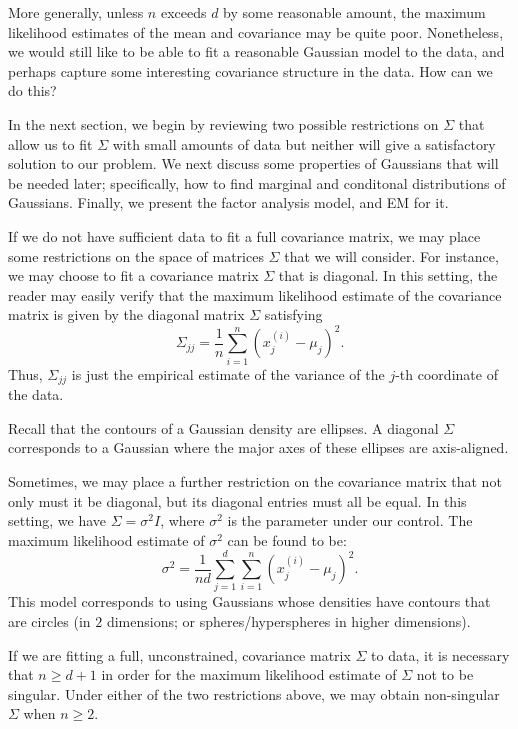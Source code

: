 More generally, unless $n$ exceeds $d$ by some reasonable amount, the maximum likelihood estimates of the mean and covariance may be quite poor.
Nonetheless, we would still like to be able to fit a reasonable Gaussian model
to the data, and perhaps capture some interesting covariance structure in
the data. How can we do this?

In the next section, we begin by reviewing two possible restrictions on
$\Sigma$ that allow us to fit $\Sigma$ with small amounts of data but neither will give
a satisfactory solution to our problem. We next discuss some properties of
Gaussians that will be needed later; specifically, how to find marginal and
conditonal distributions of Gaussians. Finally, we present the factor analysis
model, and EM for it.

\vspace{1cm}
If we do not have sufficient data to fit a full covariance matrix, we may
place some restrictions on the space of matrices $\Sigma$ that we will consider. For
instance, we may choose to fit a covariance matrix $\Sigma$ that is diagonal. In this
setting, the reader may easily verify that the maximum likelihood estimate
of the covariance matrix is given by the diagonal matrix $\Sigma$ satisfying
\[
\Sigma_{jj} =
\frac 1 n \sum^n_{i=1} (x^{(i)}_j - \mu_j)^2.
\]
Thus, $\Sigma_{jj}$ is just the empirical estimate of the variance of the $j$-th coordinate
of the data.

Recall that the contours of a Gaussian density are ellipses. A diagonal
$\Sigma$ corresponds to a Gaussian where the major axes of these ellipses are axis-aligned.

Sometimes, we may place a further restriction on the covariance matrix
that not only must it be diagonal, but its diagonal entries must all be equal.
In this setting, we have $\Sigma = \sigma^2 I$, where $\sigma^2$
is the parameter under our control.
The maximum likelihood estimate of $\sigma^2$ can be found to be:
\[
    \sigma^2 = \frac{1}{nd} \sum^d_{j=1}\sum^n_{i=1}(x^{(i)}_j - \mu_j)^2.
\]
This model corresponds to using Gaussians whose densities have contours
that are circles (in $2$ dimensions; or spheres/hyperspheres in higher dimensions).

If we are fitting a full, unconstrained, covariance matrix $\Sigma$ to data, it is
necessary that $n \ge d + 1$ in order for the maximum likelihood estimate of $\Sigma$
not to be singular. Under either of the two restrictions above, we may obtain
non-singular $\Sigma$ when $n \ge 2$.

